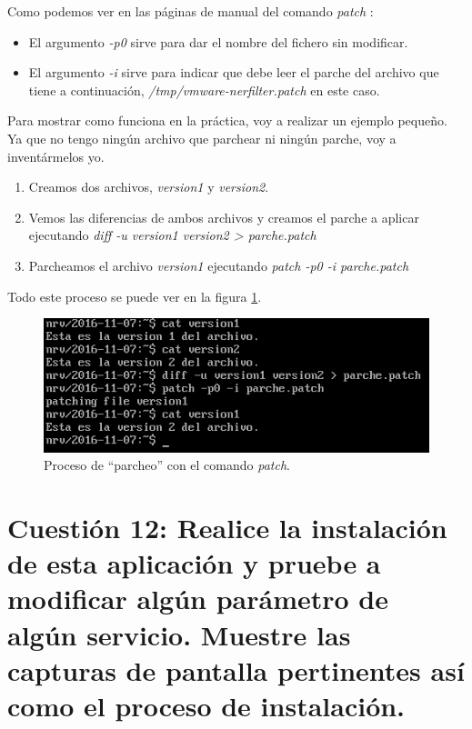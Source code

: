 \documentclass[a4paper,titlepage,12pt]{scrartcl}	%
\numberwithin{figure}{section} %
\numberwithin{table}{section} %
\begin{document}
	Como podemos ver en las páginas de manual del comando \textit{patch} \cite{manpatch}:
	\begin{itemize}
		\item El argumento \textit{-p0} sirve para dar el nombre del fichero sin modificar.
		\item El argumento \textit{-i} sirve para indicar que debe leer el parche del archivo que tiene a continuación, \textit{/tmp/vmware-nerfilter.patch} en este caso.
	\end{itemize}
	
	Para mostrar como funciona en la práctica, voy a realizar un ejemplo pequeño. Ya que no tengo ningún archivo que parchear ni ningún parche, voy a inventármelos yo.
	\begin{enumerate}
		\item Creamos dos archivos, \textit{version1} y \textit{version2}.
		\item Vemos las diferencias de ambos archivos y creamos el parche a aplicar ejecutando \textit{diff -u version1 version2 > parche.patch}
		\item Parcheamos el archivo \textit{version1} ejecutando \textit{patch -p0 -i parche.patch}
	\end{enumerate}
	
	Todo este proceso se puede ver en la figura \ref{11-patch}.
	\begin{figure}[H]
		\includegraphics[width=\linewidth]{./Imagenes/11-patch.png}
		\vspace{-0.5cm}
		\caption[Proceso de ``parcheo'' con el comando \textit{patch}.]{Proceso de ``parcheo'' con el comando \textit{patch}.}
		\label{11-patch}
	\end{figure}
	
	\section[Cuestión 12: Realice la instalación de esta aplicación y pruebe a modificar algún parámetro de algún servicio. Muestre las capturas de pantalla pertinentes así como el proceso de instalación.]{Cuestión 12: Realice la instalación de esta aplicación y pruebe a modificar algún parámetro de algún servicio. Muestre las capturas de pantalla pertinentes así como el proceso de instalación.}
	
\end{document}
